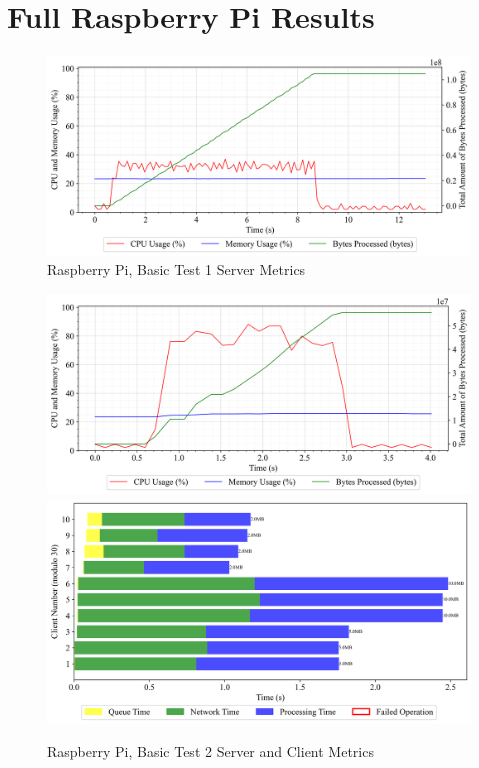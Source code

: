 \section{Full Raspberry Pi Results}
\begin{figure}[h!t]
    \begin{center}
    \label{Fig:A1.13}
    \caption{Raspberry Pi, Basic Test 1 Server Metrics}
    \includegraphics[width=\x\textwidth]{Chapter4/Results/raspberry-pi_results/raspberry-pi_basic_1_20241004_140120.db_server_metrics.png}
    \end{center}
\end{figure}

\begin{figure}[h!t]
    \begin{center}
    \label{Fig:A1.14}
    \caption{Raspberry Pi, Basic Test 2 Server and Client Metrics}
    \includegraphics[width=\x\textwidth]{Chapter4/Results/raspberry-pi_results/raspberry-pi_basic_2_20241004_140133.db_server_metrics.png}
    \includegraphics[width=\x\textwidth]{Chapter4/Results/raspberry-pi_results/raspberry-pi_basic_2_20241004_140133.db_client_tasks.png}
    \end{center}
\end{figure}


